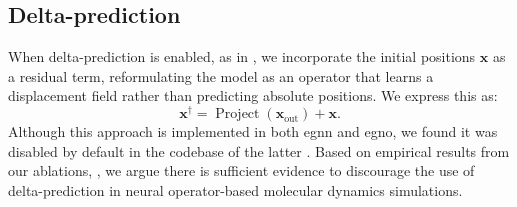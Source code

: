 

\subsection{Delta-prediction}
\label{sec:delta_prediction}
When delta-prediction is enabled, as in , we incorporate the initial positions \(\mathbf{x}\) as a residual term, reformulating the model as an operator that learns a displacement field rather than predicting absolute positions. We express this as:
\begin{equation}
    \mathbf{x}^\dagger = \operatorname{Project}(\mathbf{x}_{\text{out}}) + \mathbf{x}.
\end{equation}
Although this approach is implemented in both \gls{egnn} and \gls{egno}, we found it was disabled by default in the codebase of the latter \cite{garcia_satorras_en_2021, xu_equivariant_2024}. Based on empirical results from our ablations, , we argue there is sufficient evidence to discourage the use of delta-prediction in neural operator-based molecular dynamics simulations.



